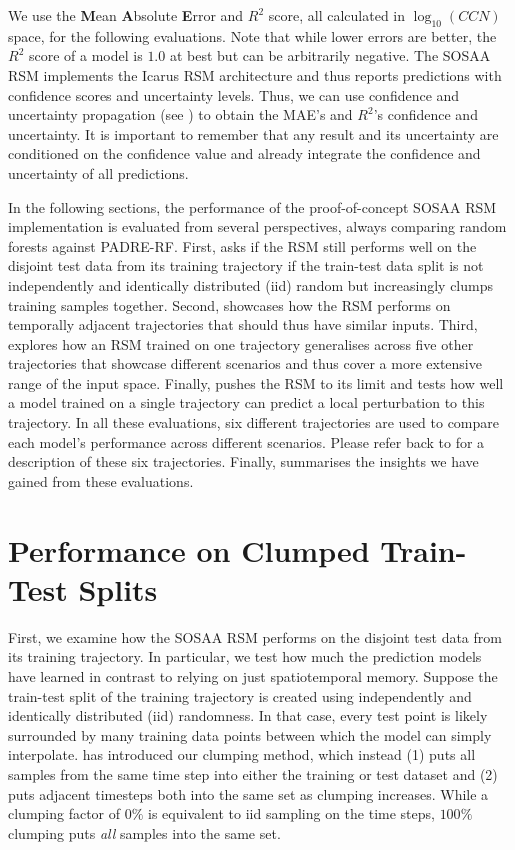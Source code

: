 \noindent We use the \textbf{M}ean \textbf{A}bsolute \textbf{E}rror and $R^2$ score, all calculated in $\log_{10}(CCN)$ space, for the following evaluations. Note that while lower errors are better, the $R^2$ score of a model is $1.0$ at best but can be arbitrarily negative. The SOSAA RSM implements the Icarus RSM architecture and thus reports predictions with confidence scores and uncertainty levels. Thus, we can use confidence and uncertainty propagation (see ) to obtain the MAE's and $R^2$'s confidence and uncertainty. It is important to remember that any result and its uncertainty are conditioned on the confidence value and already integrate the confidence and uncertainty of all predictions.

In the following sections, the performance of the proof-of-concept SOSAA RSM implementation is evaluated from several perspectives, always comparing random forests against PADRE-RF. First,  asks if the RSM still performs well on the disjoint test data from its training trajectory if the train-test data split is not independently and identically distributed (iid) random but increasingly clumps training samples together. Second,  showcases how the RSM performs on temporally adjacent trajectories that should thus have similar inputs. Third,  explores how an RSM trained on one trajectory generalises across five other trajectories that showcase different scenarios and thus cover a more extensive range of the input space. Finally,  pushes the RSM to its limit and tests how well a model trained on a single trajectory can predict a local perturbation to this trajectory. In all these evaluations, six different trajectories are used to compare each model's performance across different scenarios. Please refer back to  for a description of these six trajectories. Finally,  summarises the insights we have gained from these evaluations.

\section{Performance on Clumped Train-Test Splits} \label{txt:clump-generalisation}

First, we examine how the SOSAA RSM performs on the disjoint test data from its training trajectory. In particular, we test how much the prediction models have learned in contrast to relying on just spatiotemporal memory. Suppose the train-test split of the training trajectory is created using independently and identically distributed (iid) randomness. In that case, every test point is likely surrounded by many training data points between which the model can simply interpolate.  has introduced our clumping method, which instead (1) puts all samples from the same time step into either the training or test dataset and (2) puts adjacent timesteps both into the same set as clumping increases. While a clumping factor of $0\%$ is equivalent to iid sampling on the time steps, $100\%$ clumping puts \textit{all} samples into the same set.


